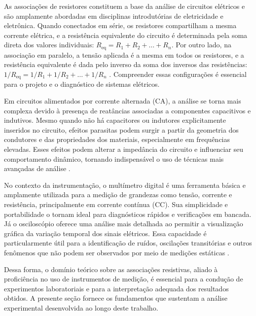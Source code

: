 \documentclass[conference]{IEEEtran}
\begin{document}

As associações de resistores constituem a base da análise de circuitos elétricos e são amplamente abordadas em disciplinas introdutórias de eletricidade e eletrônica. Quando conectados em série, os resistores compartilham a mesma corrente elétrica, e a resistência equivalente do circuito é determinada pela soma direta dos valores individuais: $R_\text{eq} = R_1 + R_2 + \dots + R_n$. Por outro lado, na associação em paralelo, a tensão aplicada é a mesma em todos os resistores, e a resistência equivalente é dada pelo inverso da soma dos inversos das resistências: $1/R_\text{eq} = 1/R_1 + 1/R_2 + \dots + 1/R_n$ \cite{hayt2019analise}. Compreender essas configurações é essencial para o projeto e o diagnóstico de sistemas elétricos.

Em circuitos alimentados por corrente alternada (CA), a análise se torna mais complexa devido à presença de reatâncias associadas a componentes capacitivos e indutivos. Mesmo quando não há capacitores ou indutores explicitamente inseridos no circuito, efeitos parasitas podem surgir a partir da geometria dos condutores e das propriedades dos materiais, especialmente em frequências elevadas. Esses efeitos podem alterar a impedância do circuito e influenciar seu comportamento dinâmico, tornando indispensável o uso de técnicas mais avançadas de análise \cite{halliday}.

No contexto da instrumentação, o multímetro digital é uma ferramenta básica e amplamente utilizada para a medição de grandezas como tensão, corrente e resistência, principalmente em corrente contínua (CC). Sua simplicidade e portabilidade o tornam ideal para diagnósticos rápidos e verificações em bancada. Já o osciloscópio oferece uma análise mais detalhada ao permitir a visualização gráfica da variação temporal dos sinais elétricos. Essa capacidade é particularmente útil para a identificação de ruídos, oscilações transitórias e outros fenômenos que não podem ser observados por meio de medições estáticas \cite{hayt2019analise}.

Dessa forma, o domínio teórico sobre as associações resistivas, aliado à proficiência no uso de instrumentos de medição, é essencial para a condução de experimentos laboratoriais e para a interpretação adequada dos resultados obtidos. A presente seção fornece os fundamentos que sustentam a análise experimental desenvolvida ao longo deste trabalho.
\end{document}
